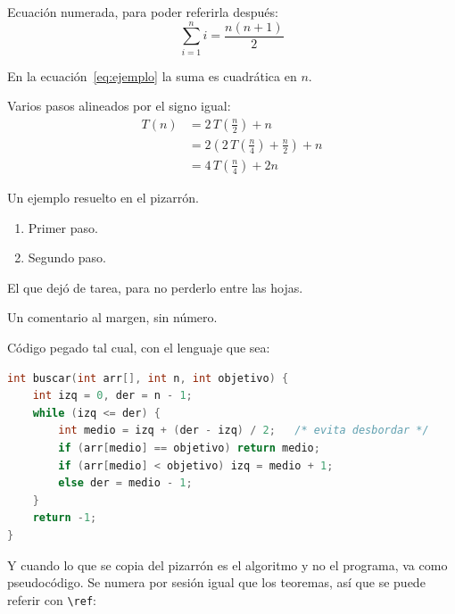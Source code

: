 Ecuación numerada, para poder referirla después:
\begin{equation}\label{eq:ejemplo}
  \sum_{i=1}^{n} i = \frac{n(n+1)}{2}
\end{equation}

En la ecuación~\eqref{eq:ejemplo} la suma es cuadrática en $n$.

Varios pasos alineados por el signo igual:
\begin{align}
  T(n) &= 2\,T\!\left(\frac{n}{2}\right) + n \\
       &= 2\left(2\,T\!\left(\frac{n}{4}\right)
          + \frac{n}{2}\right) + n \nonumber \\
       &= 4\,T\!\left(\frac{n}{4}\right) + 2n
\end{align}

\begin{ejemplo}
  Un ejemplo resuelto en el pizarrón.
  \begin{enumerate}[label=\arabic*., itemsep=0.2em]
    \item Primer paso.
    \item Segundo paso.
  \end{enumerate}
\end{ejemplo}

\begin{ejercicio}
  El que dejó de tarea, para no perderlo entre las hojas.
\end{ejercicio}

\begin{observacion}
  Un comentario al margen, sin número.
\end{observacion}

Código pegado tal cual, con el lenguaje que sea:

\begin{lstlisting}[language=C,caption={Búsqueda binaria}]
int buscar(int arr[], int n, int objetivo) {
    int izq = 0, der = n - 1;
    while (izq <= der) {
        int medio = izq + (der - izq) / 2;   /* evita desbordar */
        if (arr[medio] == objetivo) return medio;
        if (arr[medio] < objetivo) izq = medio + 1;
        else der = medio - 1;
    }
    return -1;
}
\end{lstlisting}

Y cuando lo que se copia del pizarrón es el algoritmo y no el
programa, va como pseudocódigo. Se numera por sesión igual que los
teoremas, así que se puede referir con \verb|\ref|:

